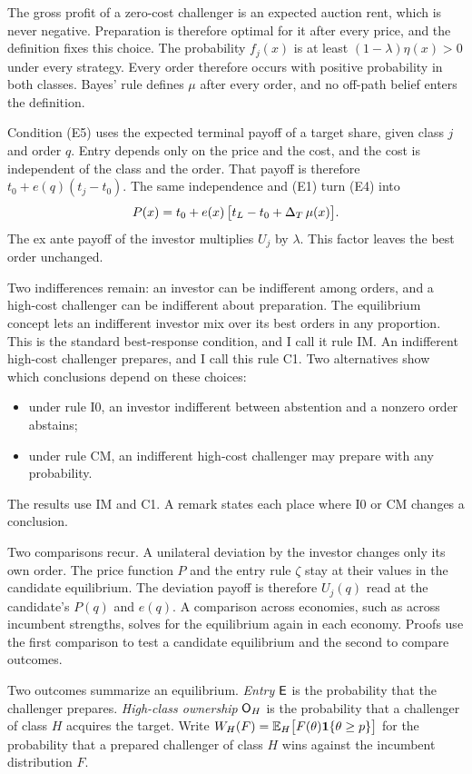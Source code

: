 The gross profit of a zero-cost challenger is an expected auction rent, which is never negative. Preparation is
therefore optimal for it after every price, and the definition fixes this choice. The probability \(f_j(x)\) is
at least \((1-\lambda)\eta(x)>0\) under every strategy. Every order therefore occurs with positive probability in
both classes. Bayes' rule defines \(\mu\) after every order, and no off-path belief enters the definition.

Condition (E5) uses the expected terminal payoff of a target share, given class \(j\) and order \(q\). Entry
depends only on the price and the cost, and the cost is independent of the class and the order. That payoff is
therefore \(t_0+e(q)(t_j-t_0)\). The same independence and (E1) turn (E4) into
\begin{equation}\label{eq:price}
P(x)=t_0+e(x)\,\bigl[t_L-t_0+\Delta_T\,\mu(x)\bigr].
\end{equation}
The ex ante payoff of the investor multiplies \(U_j\) by \(\lambda\). This factor leaves the best order
unchanged.

Two indifferences remain: an investor can be indifferent among orders, and a high-cost challenger can be
indifferent about preparation. The equilibrium concept lets an indifferent investor mix over its best orders in
any proportion. This is the standard best-response condition, and I call it rule IM. An indifferent high-cost
challenger prepares, and I call this rule C1. Two alternatives show which conclusions depend on these choices:
\begin{itemize}[leftmargin=2em]
\item under rule I0, an investor indifferent between abstention and a nonzero order abstains;
\item under rule CM, an indifferent high-cost challenger may prepare with any probability.
\end{itemize}
The results use IM and C1. A remark states each place where I0 or CM changes a conclusion.

Two comparisons recur. A unilateral deviation by the investor changes only its own order. The price function
\(P\) and the entry rule \(\zeta\) stay at their values in the candidate equilibrium. The deviation payoff is
therefore \(U_j(q)\) read at the candidate's \(P(q)\) and \(e(q)\). A comparison across economies, such as
across incumbent strengths, solves for the equilibrium again in each economy. Proofs use the first comparison to
test a candidate equilibrium and the second to compare outcomes.

Two outcomes summarize an equilibrium. \emph{Entry} \(\mathsf{E}\) is the probability that the challenger prepares.
\emph{High-class ownership} \(\mathsf{O}_H\) is the probability that a challenger of class \(H\) acquires the target.
Write \(W_H(F)=\mathbb{E}_H\bigl[F(\theta)\mathbf{1}\{\theta\ge p\}\bigr]\) for the probability that a prepared challenger of
class \(H\) wins against the incumbent distribution \(F\).
